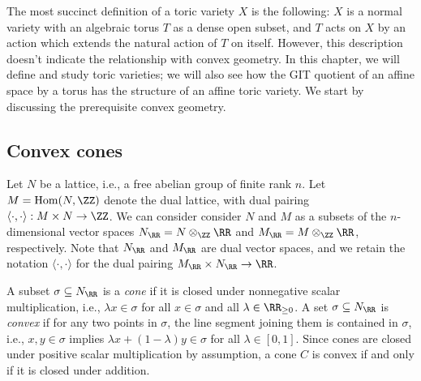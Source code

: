 \documentclass[12pt]{amsart}
\theoremstyle{plain}
\begin{document}
The most succinct definition of a toric variety $X$ is the following:
$X$ is a normal variety with an algebraic torus $T$ as a dense open subset, and $T$ acts on $X$ by an action which extends the natural action of $T$ on itself.
However, this description doesn't indicate the relationship with convex geometry.
In this chapter, we will define and study toric varieties; we will also see how the GIT quotient of an affine space by a torus has the structure of an affine toric variety.
We start by discussing the prerequisite convex geometry.

\subsection{Convex cones}
Let $N$ be a lattice, i.e., a free abelian group of finite rank $n$.
Let $M = \mathrm{Hom}(N, \ZZ)$ denote the dual lattice, with dual pairing $\langle \cdot, \cdot \rangle : M \times N \to \ZZ$.
We can consider consider $N$ and $M$ as a subsets of the $n$-dimensional vector spaces
$N_\RR = N \otimes_\ZZ \RR$ and $M_\RR = M \otimes_\ZZ \RR$, respectively.
Note that $N_\RR$ and $M_\RR$ are dual vector spaces, and we retain the notation $\langle \cdot, \cdot \rangle$ for the dual pairing $M_\RR \times N_\RR \to \RR$.

A subset $\sigma \subseteq N_\RR$ is a \emph{cone} if it is closed under nonnegative scalar multiplication, i.e., $\lambda x \in \sigma$ for all $x \in \sigma$ and all $\lambda \in \RR_{\ge 0}$.
A set $\sigma \subseteq N_\RR$ is \emph{convex} if for any two points in $\sigma$, the line segment joining them is contained in $\sigma$,
i.e., $x, y \in \sigma$ implies $\lambda x + (1 - \lambda) y \in \sigma$ for all $\lambda \in [0, 1]$.
Since cones are closed under positive scalar multiplication by assumption, a cone $C$ is convex if and only if it is closed under addition.
\end{document}
